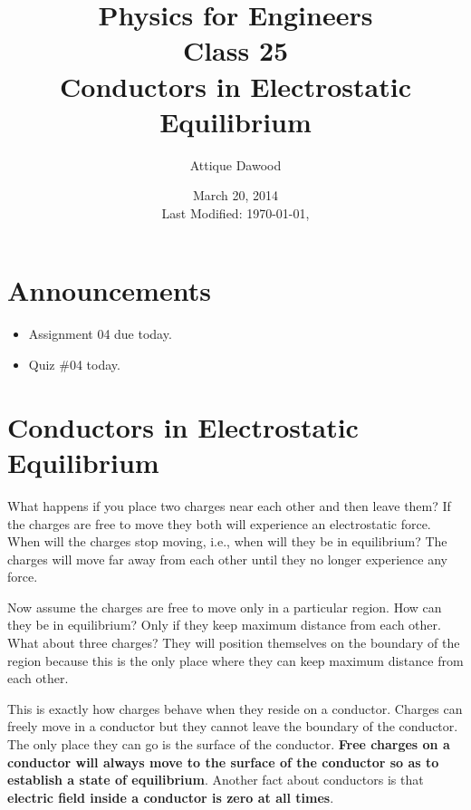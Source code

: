 \documentclass[12pt,a4paper]{article}
\title{\vspace{-3cm}Physics for Engineers\\Class 25\\Conductors in Electrostatic Equilibrium}
\author{Attique Dawood}
\date{March 20, 2014\\[0.2cm] Last Modified: \today, \currenttime}
\begin{document}
\maketitle
\section{Announcements}
\begin{itemize}
\item Assignment 04 due today.
\item Quiz \#04 today.
\end{itemize}
\section{Conductors in Electrostatic Equilibrium}
What happens if you place two charges near each other and then leave them? If the charges are free to move they both will experience an electrostatic force. When will the charges stop moving, i.e., when will they be in equilibrium? The charges will move far away from each other until they no longer experience any force.

Now assume the charges are free to move only in a particular region. How can they be in equilibrium? Only if they keep maximum distance from each other. What about three charges? They will position themselves on the boundary of the region because this is the only place where they can keep maximum distance from each other.

This is exactly how charges behave when they reside on a conductor. Charges can freely move in a conductor but they cannot leave the boundary of the conductor. The only place they can go is the surface of the conductor. \textbf{Free charges on a conductor will always move to the surface of the conductor so as to establish a state of equilibrium}. Another fact about conductors is that \textbf{electric field inside a conductor is zero at all times}.
\end{document}
